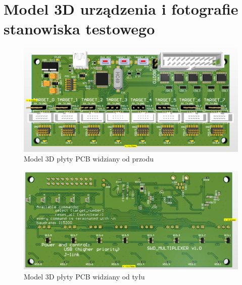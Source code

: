\chapter{Model 3D  urządzenia i fotografie stanowiska testowego}

\begin{figure}[H]
    \centering
    \includegraphics[width=0.75\paperwidth]{images/front_PCB.png}
    \caption{Model 3D płyty PCB widziany od przodu}
    \label{PCB_front}
\end{figure}

\begin{figure}[H]
    \centering
    \includegraphics[width=0.75\paperwidth]{images/back_PCB.png}
    \caption{Model 3D płyty PCB widziany od tyłu}
    \label{PCB_back}
\end{figure}

